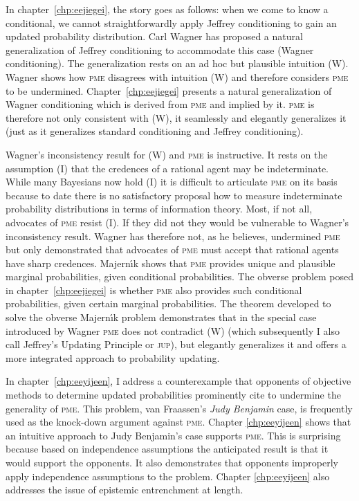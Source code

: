 \documentclass[phd,12pt,oneside]{ubcthesis}
\begin{document}
In chapter~\ref{chp:eejiegei}, the story goes as follows: when we come
to know a conditional, we cannot straightforwardly apply Jeffrey
conditioning to gain an updated probability distribution. Carl Wagner
has proposed a natural generalization of Jeffrey conditioning to
accommodate this case (Wagner conditioning). The generalization rests
on an ad hoc but plausible intuition (W). Wagner shows how
\textsc{pme} disagrees with intuition (W) and therefore considers
\textsc{pme} to be undermined. Chapter~\ref{chp:eejiegei} presents a
natural generalization of Wagner conditioning which is derived from
\textsc{pme} and implied by it. \textsc{pme} is therefore not only
consistent with (W), it seamlessly and elegantly generalizes it (just
as it generalizes standard conditioning and Jeffrey conditioning).

Wagner's inconsistency result for (W) and \textsc{pme} is instructive.
It rests on the assumption (I) that the credences of a rational agent
may be indeterminate. While many Bayesians now hold (I) it is
difficult to articulate \textsc{pme} on its basis because to date
there is no satisfactory proposal how to measure indeterminate
probability distributions in terms of information theory. Most, if not all, advocates of \textsc{pme} resist
(I). If they did not they would be vulnerable to Wagner's
inconsistency result. Wagner has therefore not, as he believes,
undermined \textsc{pme} but only demonstrated that advocates of
\textsc{pme} must accept that rational agents have sharp credences.
Majern{\'\i}k shows that \textsc{pme} provides unique and plausible
marginal probabilities, given conditional probabilities. The obverse
problem posed in chapter~\ref{chp:eejiegei} is whether \textsc{pme}
also provides such conditional probabilities, given certain marginal
probabilities. The theorem developed to solve the obverse
Majern{\'\i}k problem demonstrates that in the special case introduced
by Wagner \textsc{pme} does not contradict (W) (which subsequently I
also call Jeffrey's Updating Principle or  \textsc{jup}), but elegantly
generalizes it and offers a more integrated approach to probability
updating.

In chapter~\ref{chp:eeyijeen}, I address a counterexample that
opponents of objective methods to determine updated probabilities
prominently cite to undermine the generality of \textsc{pme}. This
problem, van Fraassen's \emph{Judy Benjamin} case, is frequently used
as the knock-down argument against \textsc{pme}. Chapter
\ref{chp:eeyijeen} shows that an intuitive approach to Judy Benjamin's
case supports \textsc{pme}. This is surprising because based on
independence assumptions the anticipated result is that it would
support the opponents. It also demonstrates that opponents improperly
apply independence assumptions to the problem. Chapter
\ref{chp:eeyijeen} also addresses the issue of epistemic entrenchment
at length.
\end{document}
